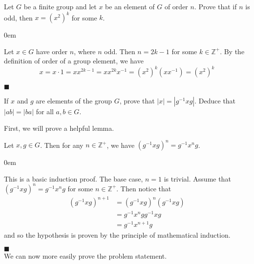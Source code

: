 \documentclass[12pt]{article}
\renewcommand{\qed}{\hfill$\blacksquare$}
\renewenvironment{proof}{\begin{addmargin}[1em]{0em}\begin{newproof}}{\end{newproof}\end{addmargin}\qed}
\newenvironment{lemma}[2][Lemma]{\begin{trivlist}
\item[\hskip \labelsep {\bfseries #1}\hskip \labelsep {\bfseries #2.}]}{\end{trivlist}}
\newenvironment{problem}[2][Exercise]{\begin{trivlist}
\item[\hskip \labelsep {\bfseries #1}\hskip \labelsep {\bfseries #2.}]}{\end{trivlist}}
\begin{document}
\begin{problem}{1.1.21}
Let $G$ be a finite group and let $x$ be an element of $G$ of order $n$. Prove that if $n$ is odd, then $x=\left(x^2\right)^k$ for some $k$.
\end{problem}
\begin{proof}
Let $x\in G$ have order $n$, where $n$ odd. Then $n=2k-1$ for some $k\in \mathbb{Z}^+$. By the definition of order of a group element, we have
$$ x = x\cdot 1 = x x^{2k-1} = x x^{2k}x^{-1} =\left(x^2\right)^k \left(xx^{-1}\right) = \left(x^2\right)^k $$
\end{proof}


\begin{problem}{1.1.22}
If $x$ and $g$ are elements of the group $G$, prove that $\left|x\right| = \left|g^{-1}xg\right|$. Deduce that $\left|ab\right|=\left|ba\right|$ for all $a,b\in G$.
\end{problem}
First, we will prove a helpful lemma.
\begin{lemma}{1.2.22}
Let $x,g \in G$. Then for any $n\in \mathbb{Z}^+$, we have $\left(g^{-1}xg\right)^n = g^{-1}x^ng$.
\end{lemma}
\begin{proof}
This is a basic induction proof. The base case, $n=1$ is trivial. Assume that $\left(g^{-1}xg\right)^n = g^{-1}x^ng$ for some $n\in \mathbb{Z}^+$. Then notice that
\begin{equation*}
    \begin{split}
        \left(g^{-1}xg\right)^{n+1} & = \left(g^{-1}xg\right)^n \left(g^{-1}xg\right) \\
        & = g^{-1}x^n g g^{-1}xg \\
        & = g^{-1}x^{n+1}g
    \end{split}
\end{equation*}
and so the hypothesis is proven by the principle of mathematical induction.
\end{proof} \\
We can now more easily prove the problem statement.\\
\end{document}

